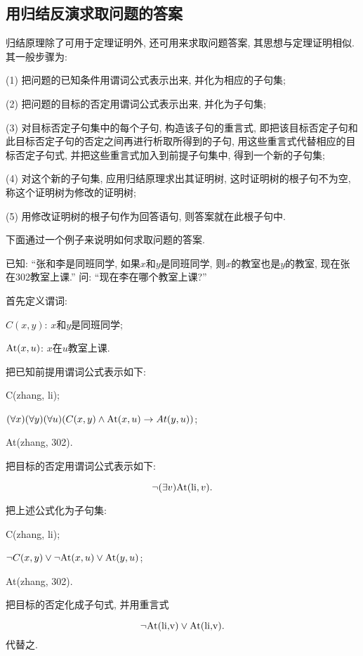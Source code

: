 \subsection{用归结反演求取问题的答案}
归结原理除了可用于定理证明外, 还可用来求取问题答案, 其思想与定理证明相似. 其一般步骤为:

(1) 把问题的已知条件用谓词公式表示出来, 并化为相应的子句集;

(2) 把问题的目标的否定用谓词公式表示出来, 并化为子句集;

(3) 对目标否定子句集中的每个子句, 构造该子句的重言式, 即把该目标否定子句和此目标否定子句的否定之间再进行析取所得到的子句, 用这些重言式代替相应的目标否定子句式, 并把这些重言式加入到前提子句集中, 得到一个新的子句集;

(4) 对这个新的子句集, 应用归结原理求出其证明树, 这时证明树的根子句不为空, 称这个证明树为修改的证明树;

(5) 用修改证明树的根子句作为回答语句, 则答案就在此根子句中.

下面通过一个例子来说明如何求取问题的答案.
\begin{example}
已知: “张和李是同班同学, 如果$x$和$y$是同班同学, 则$x$的教室也是$y$的教室, 现在张在302教室上课.” 问: “现在李在哪个教室上课?”
\end{example}
\begin{result}
首先定义谓词:

\quad $C(x, y)$:     $x$和$y$是同班同学;

\quad $\textup{At}(x, u)$:    $x$在$u$教室上课.

把已知前提用谓词公式表示如下:

\quad C(zhang, li);

\quad $(\forall x) (\forall y) (\forall u) (C(x, y)\wedge \textup{At}(x, u)\rightarrow At(y,u))$;

\quad \textup{At}(zhang, 302).

把目标的否定用谓词公式表示如下:

$$\neg (\exists  v)\textup{At}(\textup{li}, v).$$

把上述公式化为子句集:

\textup{C(zhang, li)};

$\neg C(x, y)\vee \neg \textup{At}(x, u)\vee \textup{At}(y, u)$;

\textup{At}(zhang, 302).

把目标的否定化成子句式, 并用重言式

    $$\neg \textup{At(li,v)} \vee \textup{At(li,v)}.$$
代替之.
\end{result}

